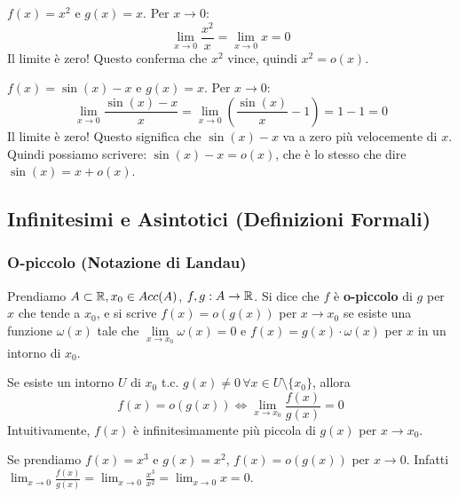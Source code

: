 \begin{example}
$f(x) = x^2$ e $g(x) = x$. Per $x\to 0$:
$$ \lim_{x \to 0} \frac{x^2}{x} = \lim_{x \to 0} x = 0 $$
Il limite è zero! Questo conferma che $x^2$ vince, quindi $x^2 = o(x)$.
\end{example}

\begin{example}
$f(x) = \sin(x) - x$ e $g(x) = x$. Per $x\to 0$:
$$ \lim_{x \to 0} \frac{\sin(x) - x}{x} = \lim_{x \to 0} \left(\frac{\sin(x)}{x} - 1\right) = 1 - 1 = 0 $$
Il limite è zero! Questo significa che $\sin(x) - x$ va a zero più velocemente di $x$.
Quindi possiamo scrivere: $\sin(x) - x = o(x)$, che è lo stesso che dire $\sin(x) = x + o(x)$.
\end{example}

\subsection{Infinitesimi e Asintotici (Definizioni Formali)}

\subsubsection{O-piccolo (Notazione di Landau)}
\begin{definition}[O-piccolo]
Prendiamo $A \subset \mathbb{R}, x_0 \in Acc(A)$, $f,g: A \to \mathbb{R}$. Si dice che $f$ è \textbf{o-piccolo} di $g$ per $x$ che tende a $x_0$, e si scrive $f(x) = o(g(x))$ per $x \to x_0$ se esiste una funzione $\omega(x)$ tale che $\lim\limits_{x \to x_0} \omega(x) = 0$ e $f(x) = g(x) \cdot \omega(x)$ per $x$ in un intorno di $x_0$.
\end{definition}

\begin{observation}
Se esiste un intorno $U$ di $x_0$ t.c. $g(x) \neq 0 \, \forall x \in U \setminus \{x_0\}$, allora
$$ f(x) = o(g(x)) \Longleftrightarrow \lim\limits_{x\to x_0}\frac{f(x)}{g(x)}=0 $$
Intuitivamente, $f(x)$ è infinitesimamente più piccola di $g(x)$ per $x\to x_0$.
\end{observation}

\begin{example}
Se prendiamo $f(x) = x^3$ e $g(x) = x^2$, $f(x) = o(g(x))$ per $x\to 0$.
Infatti $\lim_{x\to 0} \frac{f(x)}{g(x)} = \lim_{x\to 0} \frac{x^3}{x^2} = \lim_{x\to 0} x = 0$.
\end{example}

